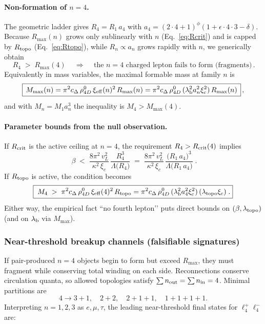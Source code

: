 \paragraph{Non-formation of \(n{=}4\).}
The geometric ladder gives \(R_4=R_1\,a_4\) with \(a_4=(2\cdot4+1)^\phi(1+\epsilon\cdot 4\cdot3-\delta)\). Because \(R_{\max}(n)\) grows only sublinearly with \(n\) (Eq.~\eqref{eq:Rcrit}) and is capped by \(R_{\rm topo}\) (Eq.~\eqref{eq:Rtopo}), while \(R_n\propto a_n\) grows rapidly with \(n\), we generically obtain
\begin{equation}
\boxed{\,R_4\;>\;R_{\max}(4)\,}\quad\Longrightarrow\quad
\boxed{\,\text{the $n{=}4$ charged lepton fails to form (fragments)}\,}.
\label{eq:no4}
\end{equation}
Equivalently in mass variables, the maximal formable mass at family \(n\) is
\begin{equation}
\boxed{\,M_{\max}(n)=\pi^2 c_\Delta\,\rho_{4D}^0\,\xi_{\rm eff}(n)^{2}\,R_{\max}(n)
= \pi^2 c_\Delta\,\rho_{4D}^0\,(\lambda_{\rm b}^2 a_n^2 \xi_c^2)\,R_{\max}(n)\,}\,,
\label{eq:Mmax}
\end{equation}
and with \(M_n=M_1 a_n^3\) the inequality is \(M_4>M_{\max}(4)\).

\paragraph{Parameter bounds from the null observation.}
If \(R_{\rm crit}\) is the active ceiling at \(n{=}4\), the requirement \(R_4>R_{\rm crit}(4)\) implies
\begin{equation}
\boxed{\;
\beta \;<\; \frac{8\pi^{2}\,v_L^{2}}{\kappa^{2}\,\xi_c}\,
\frac{R_4^{3}}{\Lambda\big(R_4\big)}
\;=\; \frac{8\pi^{2}\,v_L^{2}}{\kappa^{2}\,\xi_c}\,
\frac{\big(R_1\,a_4\big)^{3}}{\Lambda\big(R_1\,a_4\big)}\;.
}
\label{eq:betabound}
\end{equation}
If \(R_{\rm topo}\) is active, the condition becomes
\begin{equation}
\boxed{\;
M_4\;>\;\pi^2 c_\Delta\,\rho_{4D}^0\,\xi_{\rm eff}(4)^{2}\,R_{\rm topo}
=\pi^2 c_\Delta\,\rho_{4D}^0\,(\lambda_{\rm b}^2 a_4^2 \xi_c^2)\,(\lambda_{\rm topo}\xi_c)\;.
}
\label{eq:topobound}
\end{equation}
Either way, the empirical fact “no fourth lepton’’ puts direct bounds on \((\beta,\lambda_{\rm topo})\) (and on \(\lambda_{\rm b}\) via \(M_{\max}\)).

\subsubsection{Near-threshold breakup channels (falsifiable signatures)}
If pair-produced \(n{=}4\) objects begin to form but exceed \(R_{\max}\), they must fragment while conserving total winding on each side. Reconnections conserve circulation quanta, so allowed topologies satisfy \(\sum n_{\rm out}=\sum n_{\rm in}=4\). Minimal partitions are
\[
4 \to 3{+}1,\quad 2{+}2,\quad 2{+}1{+}1,\quad 1{+}1{+}1{+}1.
\]
Interpreting \(n{=}1,2,3\) as \(e,\mu,\tau\), the leading near-threshold final states for \(\ell_4^+\ell_4^-\) are:


